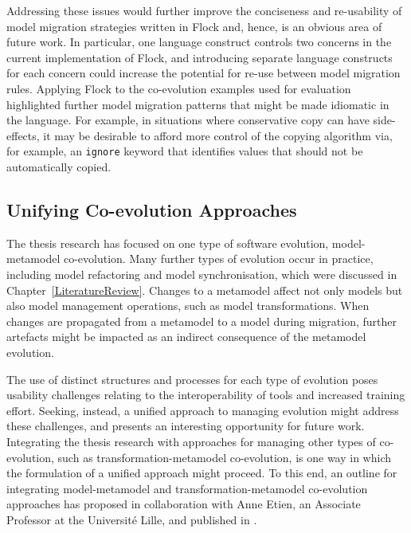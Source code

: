 Addressing these issues would further improve the conciseness and re-usability of model migration strategies written in Flock and, hence, is an obvious area of future work. In particular, one language construct controls two concerns in the current implementation of Flock, and introducing separate language constructs for each concern could increase the potential for re-use between model migration rules. Applying Flock to the co-evolution examples used for evaluation highlighted further model migration patterns that might be made idiomatic in the language. For example, in situations where conservative copy can have side-effects, it may be desirable to afford more control of the copying algorithm via, for example, an \texttt{ignore} keyword that identifies values that should not be automatically copied.


\subsection{Unifying Co-evolution Approaches}
The thesis research has focused on one type of software evolution, model-metamodel co-evolution. Many further types of evolution occur in practice, including model refactoring and model synchronisation, which were discussed in Chapter~\ref{LiteratureReview}. Changes to a metamodel affect not only models but also model management operations, such as model transformations. When changes are propagated from a metamodel to a model during migration, further artefacts might be impacted as an indirect consequence of the metamodel evolution.

The use of distinct structures and processes for each type of evolution poses usability challenges relating to the interoperability of tools and increased training effort. Seeking, instead, a unified approach to managing evolution might address these challenges, and presents an interesting opportunity for future work. Integrating the thesis research with approaches for managing other types of co-evolution, such as transformation-metamodel co-evolution, is one way in which the formulation of a unified approach might proceed. To this end, an outline for integrating model-metamodel and transformation-metamodel co-evolution approaches has proposed in collaboration with Anne Etien, an Associate Professor at the Universit\'{e} Lille, and published in \cite{rose10coevolution}.


